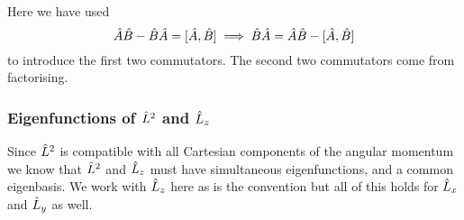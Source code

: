 Here we have used
\[\hat{A}\hat{B} - \hat{B}\hat{A} = [\hat{A}, \hat{B}] \implies \hat{B}\hat{A} = \hat{A}\hat{B} - [\hat{A}, \hat{B}]\]
to introduce the first two commutators.
The second two commutators come from factorising.

\subsubsection{Eigenfunctions of \texorpdfstring{\(\hat{L}^2\)}{Lsquared} and \texorpdfstring{\(\hat{L}_z\)}{Lz}}
Since \(\hat{L}^2\) is compatible with all Cartesian components of the angular momentum we know that \(\hat{L}^2\) and \(\hat{L}_z\) must have simultaneous eigenfunctions, and a common eigenbasis.
We work with \(\hat{L}_z\) here as is the convention but all of this holds for \(\hat{L}_x\) and \(\hat{L}_y\) as well.

